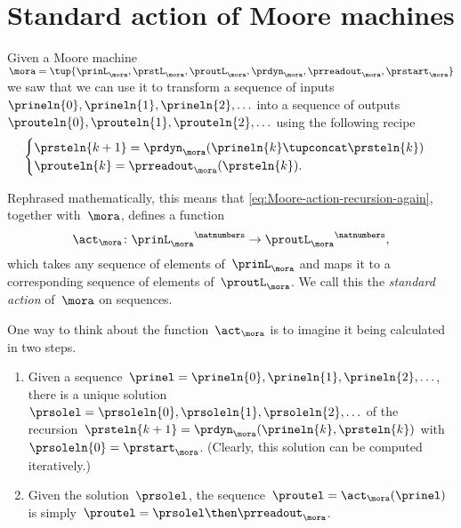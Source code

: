 
\section{Standard action of Moore machines}
\label{sec:Moore-acting-on-sequences}

Given a Moore machine~$\mora = \tup{\prinL_\mora,\prstL_\mora,\proutL_\mora,\prdyn_\mora,\prreadout_\mora,\prstart_\mora}$
we saw that we can use it to transform a sequence of inputs~$\prineln{0}, \prineln{1}, \prineln{2}, \ldots$ into a sequence of outputs~$\prouteln{0}, \prouteln{1}, \prouteln{2}, \ldots$ using the following recipe
\begin{equation}
    \label{eq:Moore-action-recursion-again}
    \begin{cases}
        \prsteln{k+1} = \prdyn_\mora(\prineln{k} \tupconcat \prsteln{k}) \\
        \prouteln{k}   = \prreadout_\mora(\prsteln{k}).
    \end{cases}
\end{equation}

Rephrased mathematically, this means that \cref{eq:Moore-action-recursion-again}, together with~$\mora$, defines a function
\begin{equation*}
    \act_{\mora} \colon {\prinL_\mora}^\natnumbers \to {\proutL_\mora}^\natnumbers,
\end{equation*}
which takes any sequence  of elements of~$\prinL_\mora$ and maps it to a corresponding sequence  of elements of~$\proutL_\mora$.
We call this the \emph{standard action} of~$\mora$ on sequences.

\begin{remark}
    \label{re:moore-action-two-steps}
    One way to think about the function~$\act_{\mora}$ is to imagine it being calculated in two steps.
    \begin{enumerate}
        \item Given a sequence~$\prinel = \prineln{0}, \prineln{1}, \prineln{2}, \ldots$, there is a unique solution~$\prsolel = \prsoleln{0}, \prsoleln{1}, \prsoleln{2}, \ldots$ of the recursion~$\prsteln{k+1} = \prdyn_\mora(\prineln{k}, \prsteln{k})$ with~$\prsoleln{0} = \prstart_\mora$.
              (Clearly, this solution can be computed iteratively.)
        \item Given the solution~$\prsolel$, the sequence~$\proutel = \act_{\mora}(\prinel)$ is simply~$\proutel = \prsolel \then \prreadout_\mora$.
    \end{enumerate}
\end{remark}

